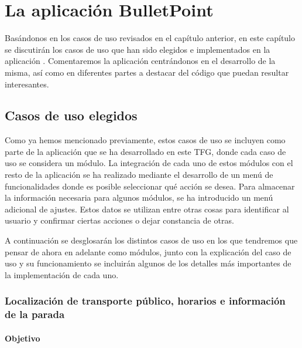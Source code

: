 %
%
%

\chapter{La aplicación BulletPoint} \label{chap:LaAplicacion} 

Basándonos en los casos de uso revisados en el capítulo anterior, en este capítulo se discutirán los casos de uso que han sido elegidos e implementados en la aplicación \BulletPoint{}. Comentaremos la aplicación centrándonos en el desarrollo de la misma, así como  en diferentes partes a destacar del código que puedan resultar interesantes.


\section{Casos de uso elegidos}

Como ya hemos mencionado previamente, estos casos de uso se incluyen como parte de la aplicación que se ha desarrollado en este TFG, donde cada caso de uso se considera un módulo. La integración de cada uno de estos módulos con el resto de la aplicación se ha realizado mediante el desarrollo de un menú de funcionalidades donde es posible seleccionar qué acción se desea. Para almacenar la información necesaria para algunos módulos, se ha introducido un menú adicional de ajustes. Estos datos se utilizan entre otras cosas para identificar al usuario y confirmar ciertas acciones o dejar constancia de otras. 


A continuación se desglosarán los distintos casos de uso en los que tendremos que pensar de ahora en adelante como módulos, junto con la explicación del caso de uso y su funcionamiento se incluirán algunos de los detalles más importantes de la implementación de cada uno.

\subsection{Localización de transporte público, horarios e información de la parada}

\subsubsection{Objetivo}


